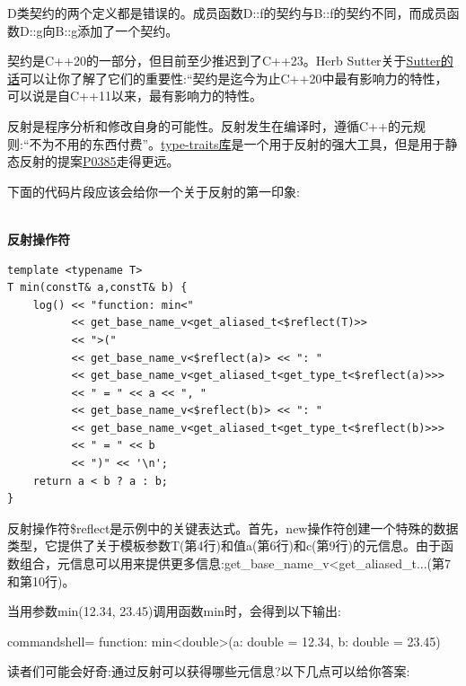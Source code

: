 D类契约的两个定义都是错误的。成员函数D::f的契约与B::f的契约不同，而成员函数D::g向B::g添加了一个契约。

\begin{tcolorbox}[breakable,enhanced jigsaw,colback=blue!5!white,colframe=blue!75!black,title={Herb Sutter的结束语}]
契约是C++20的一部分，但目前至少推迟到了C++23。Herb Sutter关于\href{https://herbsutter.com/2018/07/02/trip-report-summer-iso-c-standards-meeting-rapperswil/}{Sutter的话}可以让你了解了它们的重要性:“契约是迄今为止C++20中最有影响力的特性，可以说是自C++11以来，最有影响力的特性。
\end{tcolorbox}


反射是程序分析和修改自身的可能性。反射发生在编译时，遵循C++的元规则:“不为不用的东西付费”。\href{https://en.cppreference.com/w/cpp/header/type_traits}{type-traits库}是一个用于反射的强大工具，但是用于静态反射的提案\href{http://www.open-std.org/jtc1/sc22/wg21/docs/papers/2017/p0385r2.pdf}{P0385}走得更远。

下面的代码片段应该会给你一个关于反射的第一印象:

\hspace*{\fill} \\ %
\noindent
\textbf{反射操作符}
\begin{lstlisting}[style=styleCXX]
template <typename T>
T min(constT& a,constT& b) {
	log() << "function: min<"
		  << get_base_name_v<get_aliased_t<$reflect(T)>>
		  << ">("
		  << get_base_name_v<$reflect(a)> << ": "
		  << get_base_name_v<get_aliased_t<get_type_t<$reflect(a)>>>
		  << " = " << a << ", "
		  << get_base_name_v<$reflect(b)> << ": "
		  << get_base_name_v<get_aliased_t<get_type_t<$reflect(b)>>>
		  << " = " << b
		  << ")" << '\n';
	return a < b ? a : b;
}
\end{lstlisting}

反射操作符\$reflect是示例中的关键表达式。首先，new操作符创建一个特殊的数据类型，它提供了关于模板参数T(第4行)和值a(第6行)和c(第9行)的元信息。由于函数组合，元信息可以用来提供更多信息:get\_base\_name\_v<get\_aliased\_t...(第7和第10行)。

当用参数min(12.34, 23.45)调用函数min时，会得到以下输出:

\begin{tcblisting}{commandshell={}}
function: min<double>(a: double = 12.34, b: double = 23.45)
\end{tcblisting}

读者们可能会好奇:通过反射可以获得哪些元信息?以下几点可以给你答案:

